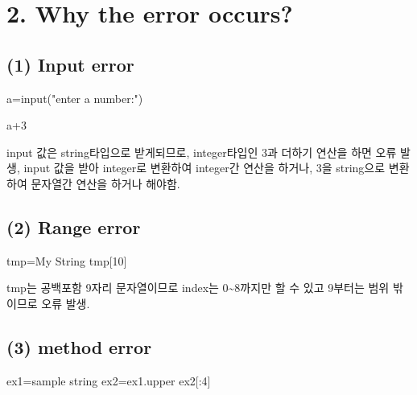 \documentclass[
  a4paper,
  DIV=11,
  numbers=noendperiod]{scrreprt}
\newenvironment{Shaded}{\begin{snugshade}}{\end{snugshade}}
\newcommand{\BuiltInTok}[1]{\textcolor[rgb]{0.00,0.23,0.31}{#1}}
\newcommand{\DecValTok}[1]{\textcolor[rgb]{0.68,0.00,0.00}{#1}}
\newcommand{\NormalTok}[1]{\textcolor[rgb]{0.00,0.23,0.31}{#1}}
\newcommand{\OperatorTok}[1]{\textcolor[rgb]{0.37,0.37,0.37}{#1}}
\newcommand{\StringTok}[1]{\textcolor[rgb]{0.13,0.47,0.30}{#1}}
\begin{document}
\section*{2. Why the error occurs?}\label{why-the-error-occurs}


\subsection*{(1) Input error}\label{input-error}

\begin{Shaded}
\begin{Highlighting}[]
\NormalTok{a}\OperatorTok{=}\BuiltInTok{input}\NormalTok{(}\StringTok{"enter a number:"}\NormalTok{)}

\NormalTok{a}\OperatorTok{+}\DecValTok{3}
\end{Highlighting}
\end{Shaded}

input 값은 string타입으로 받게되므로, integer타입인 3과 더하기 연산을
하면 오류 발생, input 값을 받아 integer로 변환하여 integer간 연산을
하거나, 3을 string으로 변환하여 문자열간 연산을 하거나 해야함.

\subsection*{(2) Range error}\label{range-error}

\begin{Shaded}
\begin{Highlighting}[]
\NormalTok{tmp}\OperatorTok{=}\StringTok{\textquotesingle{}My String\textquotesingle{}}
\NormalTok{tmp[}\DecValTok{10}\NormalTok{]}
\end{Highlighting}
\end{Shaded}

tmp는 공백포함 9자리 문자열이므로 index는 0\textasciitilde8까지만 할 수
있고 9부터는 범위 밖이므로 오류 발생.

\subsection*{(3) method error}\label{method-error}

\begin{Shaded}
\begin{Highlighting}[]
\NormalTok{ex1}\OperatorTok{=}\StringTok{\textquotesingle{}sample string\textquotesingle{}}
\NormalTok{ex2}\OperatorTok{=}\NormalTok{ex1.upper}
\NormalTok{ex2[:}\DecValTok{4}\NormalTok{]}
\end{Highlighting}
\end{Shaded}
\end{document}
